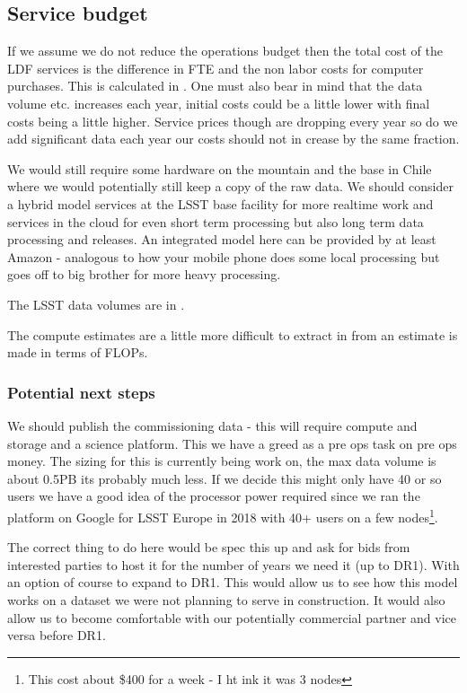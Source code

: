 \subsection{Service budget}

If we assume we do not reduce the operations budget then the total cost of the \gls{LDF} services is
the difference in \gls{FTE} and the non labor costs for computer purchases.
This is calculated in . One must also bear in mind that the data volume etc. increases each year,
initial costs could be a little lower with final costs being a little higher. Service prices though are dropping every year so do we add significant data each year our costs should not in crease by the same fraction.




We would still require some hardware on the mountain and the base in Chile where we would potentially still keep a copy of the raw data.
We should consider a hybrid model services at the \gls{LSST} base facility for more realtime work and services in the \gls{cloud} for even short term processing but also long term data processing and releases. An integrated model here can be provided by at least Amazon - analogous to how your mobile phone does some local processing but goes off to big brother for more heavy processing.

The  \gls{LSST} data volumes are in  .





The compute estimates are a little more difficult to extract in  from 
an estimate is made in terms of FLOPs.



\subsubsection {Potential next steps}\label{sec:next}

We should publish the commissioning data - this will require compute and storage and a science platform. This
we have a greed as a pre ops task on pre ops  money.
The sizing for this is currently being work on, the max data volume is about 0.5PB its probably much less.
If we decide this might only have 40 or so users we have a good idea of the processor power required since we ran the platform on Google for \gls{LSST} Europe in 2018 with 40+ users on a few  nodes\footnote{This cost about \$400 for a week - I ht ink it was 3 nodes}.

The correct thing to do here would be spec this up and ask for bids from interested parties to host it for the number of years we need it (up to DR1). With an option of course to expand to DR1. This would allow us to see how this model works on a dataset we were not planning to serve in construction. It would also allow us to become comfortable with our potentially commercial partner and vice versa before DR1.
